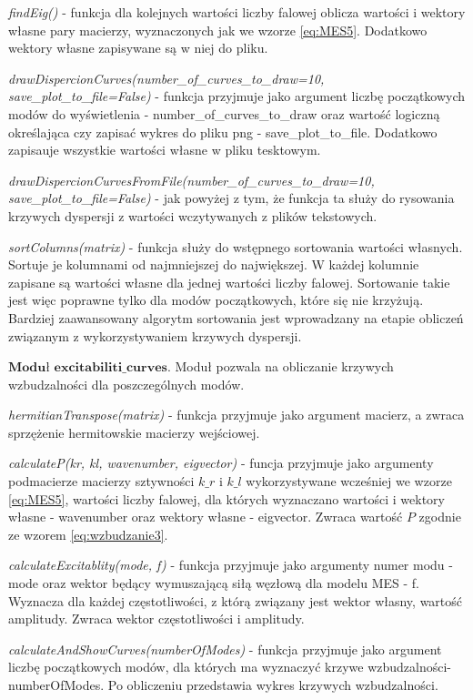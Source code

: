 \vspace {3mm}
\textit{findEig()} - funkcja dla kolejnych wartości liczby falowej oblicza wartości i wektory własne pary macierzy, wyznaczonych jak we wzorze \ref{eq:MES5}. Dodatkowo wektory własne zapisywane są w niej do pliku.

\vspace {3mm}
\textit{drawDispercionCurves(number\_of\_curves\_to\_draw=10, save\_plot\_to\_file=False)} - funkcja przyjmuje jako argument liczbę początkowych modów do wyświetlenia - number\_of\_curves\_to\_draw oraz wartość logiczną określająca czy zapisać wykres do pliku png - save\_plot\_to\_file. Dodatkowo zapisauje wszystkie wartości własne w pliku tesktowym.

\vspace {3mm}
\textit{drawDispercionCurvesFromFile(number\_of\_curves\_to\_draw=10, save\_plot\_to\_file=False)} - jak powyżej z tym, że funkcja ta służy do rysowania krzywych dyspersji z wartości wczytywanych z plików tekstowych.

\vspace {3mm}
\textit{sortColumns(matrix)} - funkcja służy do wstępnego sortowania wartości własnych. Sortuje je kolumnami od najmniejszej do największej. W każdej kolumnie zapisane są wartości własne dla jednej wartości liczby falowej. Sortowanie takie jest więc poprawne tylko dla modów początkowych, które się nie krzyżują. Bardziej zaawansowany algorytm sortowania jest wprowadzany na etapie obliczeń związanym z wykorzystywaniem krzywych dyspersji.

\vspace {3mm}
 \( \textbf{Moduł excitabiliti\_curves} \).
Moduł pozwala na obliczanie krzywych wzbudzalności dla poszczególnych modów. 

\vspace {3mm}
\textit{hermitianTranspose(matrix)} - funkcja przyjmuje jako argument macierz, a zwraca sprzężenie hermitowskie macierzy wejściowej.

\vspace {3mm}
\textit{calculateP(kr, kl, wavenumber, eigvector)} - funcja przyjmuje jako argumenty podmacierze macierzy sztywności \( k\_r \) i \(k\_l \) wykorzystywane wcześniej we wzorze \ref{eq:MES5}, wartości liczby falowej, dla których wyznaczano wartości i wektory własne - wavenumber oraz wektory własne - eigvector. Zwraca wartość \( P \) zgodnie ze wzorem \ref{eq:wzbudzanie3}.

\vspace {3mm}
\textit{calculateExcitablity(mode, f)} - funkcja przyjmuje jako argumenty numer modu - mode oraz wektor będący wymuszającą siłą węzłową dla modelu MES - f. Wyznacza dla każdej częstotliwości, z którą związany jest wektor własny, wartość amplitudy. Zwraca wektor częstotliwości i amplitudy.

\vspace {3mm}
\textit{calculateAndShowCurves(numberOfModes)} - funkcja przyjmuje jako argument liczbę początkowych modów, dla których ma wyznaczyć krzywe wzbudzalności- numberOfModes. Po obliczeniu przedstawia wykres krzywych wzbudzalności.

